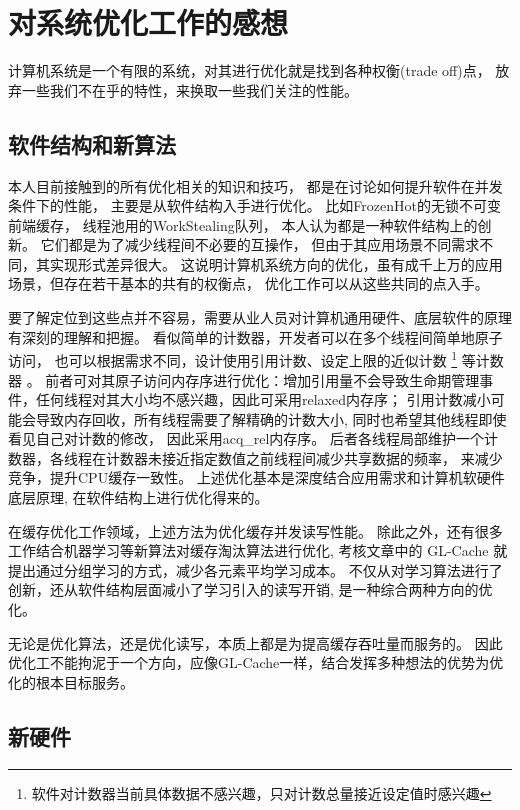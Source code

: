 \section{对系统优化工作的感想}

计算机系统是一个有限的系统，对其进行优化就是找到各种权衡(trade off)点，
放弃一些我们不在乎的特性，来换取一些我们关注的性能。

\subsection{软件结构和新算法}

本人目前接触到的所有优化相关的知识和技巧，
都是在讨论如何提升软件在并发条件下的性能，
主要是从软件结构入手进行优化。
比如FrozenHot的无锁不可变前端缓存\cite{qiu_frozenhot_2023}，
线程池用的WorkStealing队列，
本人认为都是一种软件结构上的创新。
它们都是为了减少线程间不必要的互操作，
但由于其应用场景不同需求不同，其实现形式差异很大。
这说明计算机系统方向的优化，虽有成千上万的应用场景，但存在若干基本的共有的权衡点，
优化工作可以从这些共同的点入手。

要了解定位到这些点并不容易，需要从业人员对计算机通用硬件、底层软件的原理有深刻的理解和把握。
看似简单的计数器，开发者可以在多个线程间简单地原子访问，
也可以根据需求不同，设计使用引用计数、设定上限的近似计数
\footnote{软件对计数器当前具体数据不感兴趣，只对计数总量接近设定值时感兴趣}
等计数器
\cite{perfbook}。
前者可对其原子访问内存序进行优化：增加引用量不会导致生命期管理事件，任何线程对其大小均不感兴趣，因此可采用relaxed内存序；
引用计数减小可能会导致内存回收，所有线程需要了解精确的计数大小, 同时也希望其他线程即使看见自己对计数的修改，
因此采用acq\_rel内存序。
后者各线程局部维护一个计数器，各线程在计数器未接近指定数值之前线程间减少共享数据的频率，
来减少竞争，提升CPU缓存一致性。
上述优化基本是深度结合应用需求和计算机软硬件底层原理,
在软件结构上进行优化得来的。

在缓存优化工作领域，上述方法为优化缓存并发读写性能。
除此之外，还有很多工作结合机器学习等新算法对缓存淘汰算法进行优化,
考核文章中的 GL-Cache 就提出通过分组学习的方式，减少各元素平均学习成本\cite{yang_gl-cache_nodate}。
不仅从对学习算法进行了创新，还从软件结构层面减小了学习引入的读写开销,
是一种综合两种方向的优化。

无论是优化算法，还是优化读写，本质上都是为提高缓存吞吐量而服务的。
因此优化工不能拘泥于一个方向，应像GL-Cache一样，结合发挥多种想法的优势为优化的根本目标服务。

\subsection{新硬件}


